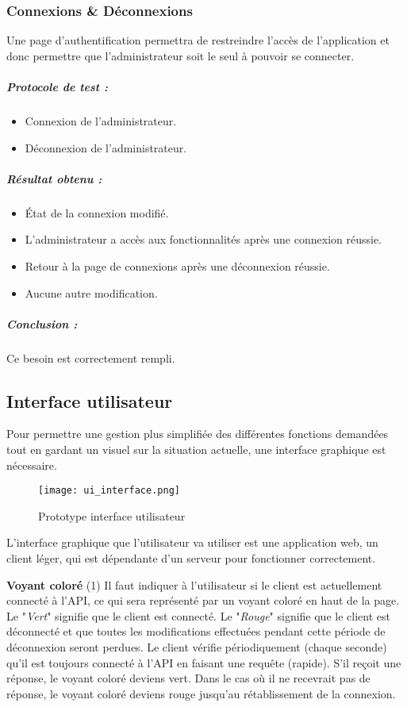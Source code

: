 \subsubsection{Connexions \& Déconnexions}
Une page d'authentification permettra de restreindre l'accès de l'application et donc permettre que l'administrateur soit le seul à pouvoir se connecter.
\subparagraph{Protocole de test :}
\begin{itemize}
    \item Connexion de l'administrateur.
    \item Déconnexion de l'administrateur.
\end{itemize}
\subparagraph{Résultat obtenu :}
    \begin{itemize}
    \item État de la connexion modifié.
    \item L'administrateur a accès aux fonctionnalités après une connexion réussie.
    \item Retour à la page de connexions après une déconnexion réussie.
    \item Aucune autre modification.
\end{itemize}
\subparagraph{Conclusion :}Ce besoin est correctement rempli.

\subsection{Interface utilisateur}
\label{sssec:ui}

Pour permettre une gestion plus simplifiée des différentes fonctions demandées tout en gardant un visuel sur la situation actuelle, une interface graphique est nécessaire.

\begin{figure}[H]
    \texttt{[image: ui\_interface.png]}
    \caption{Prototype interface utilisateur}
    \label{fig:ui_interfaces}
\end{figure}

L'interface graphique que l'utilisateur va utiliser est une application web, un client léger, qui est dépendante d'un serveur pour fonctionner correctement.\newline

\textbf{Voyant coloré} (1)\newline
Il faut indiquer à l'utilisateur si le client est actuellement connecté à l'API, ce qui sera représenté par un voyant coloré en haut de la page. Le "\textit{Vert}" signifie que le client est connecté. Le "\textit{Rouge}" signifie que le client est déconnecté et que toutes les modifications effectuées pendant cette période de déconnexion seront perdues.
Le client vérifie périodiquement (chaque seconde) qu'il est toujours connecté à l'API en faisant une requête (rapide).
S'il reçoit une réponse, le voyant coloré deviens vert.
Dans le cas où il ne recevrait pas de réponse, le voyant coloré deviens rouge jusqu'au rétablissement de la connexion.\newline

